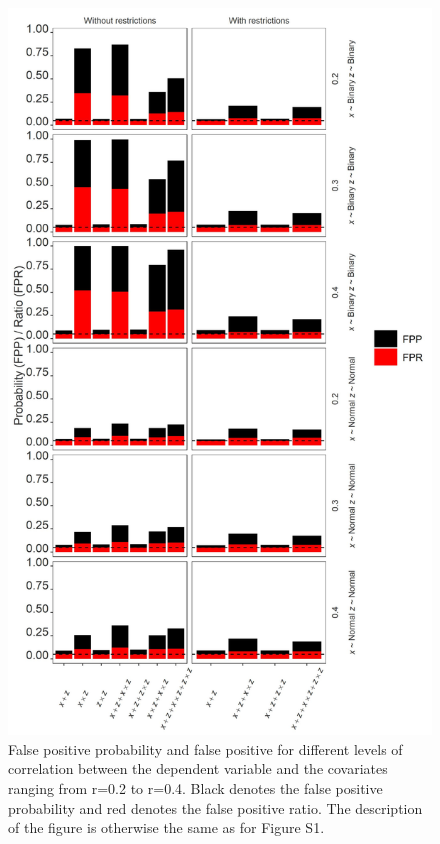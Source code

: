 \begin{figure}[hbt!]
\includegraphics[scale=0.7]{R/Analysis/Result/Figures/Figure2SI.jpeg}
\centering
\caption{False positive probability and false positive for different levels of correlation between the dependent variable and the covariates ranging from r=0.2 to r=0.4. Black denotes the false positive probability and red denotes the false positive ratio. The description of the figure is otherwise the same as for Figure S1.}
\label{fig:mainfigure}
\end{figure}


